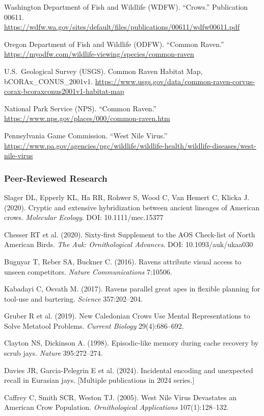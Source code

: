 \documentclass[11pt,letterpaper]{article}
\begin{document}
Washington Department of Fish and Wildlife (WDFW). ``Crows.'' Publication 00611.
\url{https://wdfw.wa.gov/sites/default/files/publications/00611/wdfw00611.pdf}

Oregon Department of Fish and Wildlife (ODFW). ``Common Raven.''
\url{https://myodfw.com/wildlife-viewing/species/common-raven}

U.S.\ Geological Survey (USGS). Common Raven Habitat Map, bCORAx\_CONUS\_2001v1.
\url{https://www.usgs.gov/data/common-raven-corvus-corax-bcoraxconus2001v1-habitat-map}

National Park Service (NPS). ``Common Raven.''
\url{https://www.nps.gov/places/000/common-raven.htm}

Pennsylvania Game Commission. ``West Nile Virus.''
\url{https://www.pa.gov/agencies/pgc/wildlife/wildlife-health/wildlife-diseases/west-nile-virus}

\subsubsection{Peer-Reviewed Research}

Slager DL, Epperly KL, Ha RR, Rohwer S, Wood C, Van Hemert C, Klicka J. (2020). Cryptic and extensive hybridization between ancient lineages of American crows. \textit{Molecular Ecology}. DOI: 10.1111/mec.15377

Chesser RT et al. (2020). Sixty-first Supplement to the AOS Check-list of North American Birds. \textit{The Auk: Ornithological Advances}. DOI: 10.1093/auk/ukaa030

Bugnyar T, Reber SA, Buckner C. (2016). Ravens attribute visual access to unseen competitors. \textit{Nature Communications} 7:10506.

Kabadayi C, Osvath M. (2017). Ravens parallel great apes in flexible planning for tool-use and bartering. \textit{Science} 357:202--204.

Gruber R et al. (2019). New Caledonian Crows Use Mental Representations to Solve Metatool Problems. \textit{Current Biology} 29(4):686--692.

Clayton NS, Dickinson A. (1998). Episodic-like memory during cache recovery by scrub jays. \textit{Nature} 395:272--274.

Davies JR, Garcia-Pelegrin E et al. (2024). Incidental encoding and unexpected recall in Eurasian jays. [Multiple publications in 2024 series.]

Caffrey C, Smith SCR, Weston TJ. (2005). West Nile Virus Devastates an American Crow Population. \textit{Ornithological Applications} 107(1):128--132.
\end{document}

